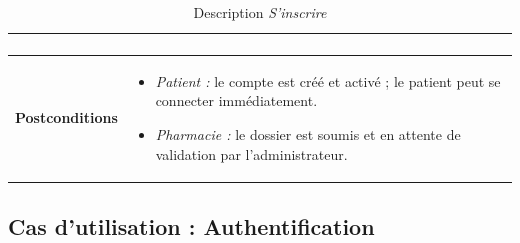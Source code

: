 \documentclass[12pt,a4paper]{report}
\begin{document}
\begin{table}[H]
\begin{tabular}{|p{4cm}|p{9cm}|}
\begin{enumerate}
        \end{enumerate} \\
        \hline
        \textbf{Postconditions} &
        \begin{itemize}
            \item \textit{Patient :} le compte est créé et activé ; le patient peut se connecter immédiatement.
            \item \textit{Pharmacie :} le dossier est soumis et en attente de validation par l'administrateur.
        \end{itemize} \\
        \hline
    \end{tabular}
    \caption{Description \textit{S'inscrire}}
\end{table}
\subsection*{Cas d'utilisation : Authentification}
\end{document}
